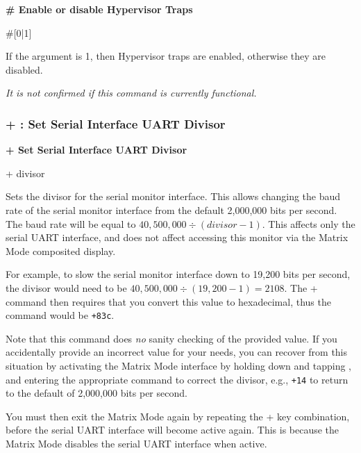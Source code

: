\begin{description}[leftmargin=2cm,style=nextline]
\item [Format:] {\bf \# Enable or disable Hypervisor Traps}
\item [Usage:] \#[0|1]

\item [Remarks:] If the argument is 1, then Hypervisor traps are enabled,
  otherwise they are disabled.

  {\em It is not confirmed if this command is currently functional.}
\end{description}


\subsubsection{+ : Set Serial Interface UART Divisor}

\begin{description}[leftmargin=2cm,style=nextline]
\item [Format:] {\bf + Set Serial Interface UART Divisor}
\item [Usage:] + divisor

\item [Remarks:] Sets the divisor for the serial monitor interface.
  This allows changing the baud rate of the serial monitor interface
  from the default 2,000,000 bits per second.  The baud rate will be
  equal to $40,500,000 \div (divisor-1)$. This affects only the
  serial UART interface, and does not affect accessing this monitor
  via the Matrix Mode composited display.

  For example, to slow the
  serial monitor interface down to 19,200 bits per second, the divisor
  would need to be $40,500,000 \div (19,200 - 1) = 2108$.
  The + command then requires that you convert this value to hexadecimal,
  thus the command would be {\tt +83c}.

  Note that this command does {\em no} sanity checking of the provided value.
  If you accidentally provide an incorrect value for your needs, you can
  recover from this situation by activating the Matrix Mode interface by holding
  down \megasymbolkey and tapping , and entering
  the appropriate command to correct the divisor, e.g., {\tt +14} to return
  to the default of 2,000,000 bits per second.

  You must then exit the Matrix
  Mode again by repeating the \megasymbolkey +  key combination,
  before the serial UART interface will become active again. This is because
  the Matrix Mode disables the serial UART interface when active.
\end{description}

